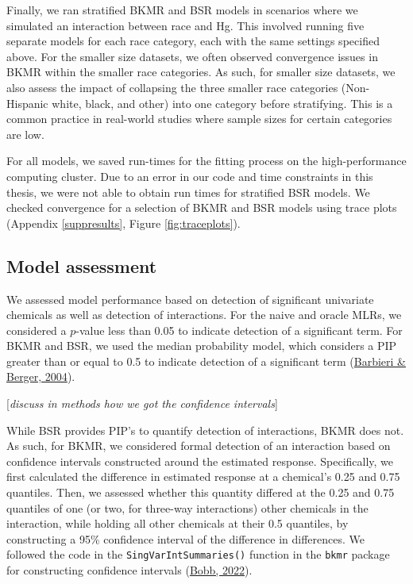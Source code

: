 \documentclass[12pt, twoside]{amherstthesis}
\begin{document}
Finally, we ran stratified BKMR and BSR models in scenarios where we simulated an interaction between race and Hg. This involved running five separate models for each race category, each with the same settings specified above. For the smaller size datasets, we often observed convergence issues in BKMR within the smaller race categories. As such, for smaller size datasets, we also assess the impact of collapsing the three smaller race categories (Non-Hispanic white, black, and other) into one category before stratifying. This is a common practice in real-world studies where sample sizes for certain categories are low.

For all models, we saved run-times for the fitting process on the high-performance computing cluster. Due to an error in our code and time constraints in this thesis, we were not able to obtain run times for stratified BSR models. We checked convergence for a selection of BKMR and BSR models using trace plots (Appendix \ref{suppresults}, Figure \ref{fig:traceplots}).

\hypertarget{model-assessment}{%
\subsection{Model assessment}\label{model-assessment}}

We assessed model performance based on detection of significant univariate chemicals as well as detection of interactions. For the naive and oracle MLRs, we considered a \(p\)-value less than 0.05 to indicate detection of a significant term. For BKMR and BSR, we used the median probability model, which considers a PIP greater than or equal to 0.5 to indicate detection of a significant term (\protect\hyperlink{ref-barbieri_optimal_2004}{Barbieri \& Berger, 2004}).

{[}\emph{discuss in methods how we got the confidence intervals}{]}

While BSR provides PIP's to quantify detection of interactions, BKMR does not. As such, for BKMR, we considered formal detection of an interaction based on confidence intervals constructed around the estimated response. Specifically, we first calculated the difference in estimated response at a chemical's 0.25 and 0.75 quantiles. Then, we assessed whether this quantity differed at the 0.25 and 0.75 quantiles of one (or two, for three-way interactions) other chemicals in the interaction, while holding all other chemicals at their 0.5 quantiles, by constructing a 95\% confidence interval of the difference in differences. We followed the code in the \texttt{SingVarIntSummaries()} function in the \texttt{bkmr} package for constructing confidence intervals (\protect\hyperlink{ref-bobb_bkmr_2022}{Bobb, 2022}).
\end{document}
